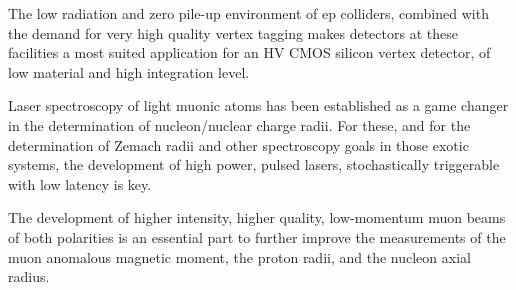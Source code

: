 The low radiation and zero pile-up environment of ep colliders, combined with the demand for very high quality vertex tagging makes detectors at these facilities a most suited application for an HV CMOS silicon vertex detector, of low material and high integration level.

Laser spectroscopy of light muonic atoms has been established as a game changer in the determination of nucleon/nuclear charge radii. For these, and for the determination of Zemach radii and other spectroscopy goals in those exotic systems, the development of high power, pulsed lasers, stochastically triggerable with low latency is key.

The development of higher intensity, higher quality, low-momentum muon beams of both polarities is an essential part to further improve the measurements of the muon anomalous magnetic moment, the proton radii, and the nucleon axial radius.

